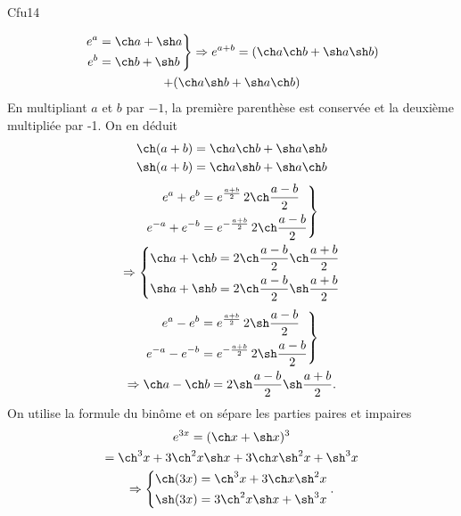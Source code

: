 \begin{tiny}Cfu14\end{tiny}
\begin{multline*}
  \left.
  \begin{aligned}
    e^a &= \ch a + \sh a \\ e^b &= \ch b + \sh b
  \end{aligned}
\right\rbrace 
\Rightarrow
e^{a + b}
= (\ch a \ch b + \sh a \sh b) \\ + (\ch a \sh b + \sh a \ch b) 
\end{multline*}
En multipliant $a$ et $b$ par $-1$, la première parenthèse est conservée et la deuxième multipliée par -1. On en déduit
\[
\begin{aligned}
\ch (a+b) &= \ch a \ch b + \sh a \sh b\\
\sh (a+b) &= \ch a \sh b + \sh a \ch b
\end{aligned}
\]
\begin{multline*}
\left.
  \begin{aligned}
  e^a + e^b &= e^{\frac{a+b}{2}}\,2\ch \frac{a-b}{2} \\
  e^{-a} + e^{-b} &= e^{-\frac{a+b}{2}}\,2\ch \frac{a-b}{2} 
  \end{aligned}
\right\rbrace \\
  \Rightarrow
\left\lbrace
\begin{aligned}
  \ch a + \ch b &= 2\ch \frac{a-b}{2} \ch \frac{a+b}{2} \\ \sh a + \sh b &= 2\ch \frac{a-b}{2} \sh \frac{a+b}{2}
\end{aligned}
\right.
\end{multline*}
\begin{multline*}
\left.
  \begin{aligned}
  e^a - e^b &= e^{\frac{a+b}{2}} \,2\sh \frac{a-b}{2} \\
  e^{-a} - e^{-b} &= e^{-\frac{a+b}{2}} \,2\sh \frac{a-b}{2} 
  \end{aligned}
\right\rbrace \\
  \Rightarrow
  \ch a - \ch b = 2\sh \frac{a-b}{2} \sh \frac{a+b}{2} .
\end{multline*}
On utilise la formule du binôme et on sépare les parties paires et impaires
\begin{multline*}
  e^{3x} = (\ch x + \sh x)^3\\
  = {\ch}^3x + 3 {\ch}^2x \sh x  + 3 \ch x {\sh}^2 x + {\sh}^3 x \\
  \Rightarrow
  \left\lbrace
  \begin{aligned}
    \ch(3x) &= {\ch}^3x  + 3 \ch x {\sh}^2 x \\
    \sh(3x) &= 3 {\ch}^2 x \sh x  + {\sh}^3 x
  \end{aligned}
\right. .
\end{multline*}
